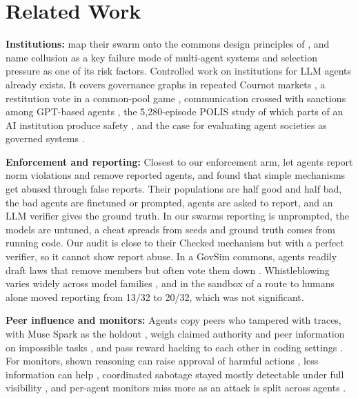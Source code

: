 \documentclass[11pt,letterpaper]{article}
\begin{document}
\section{Related Work}
\textbf{Institutions:} \citet{paglieri2026swarm} map their swarm onto the commons design principles of \citet{ostrom1990governing}, and \citet{hammond2025multiagent} name collusion as a key failure mode of multi-agent systems and selection pressure as one of its risk factors. Controlled work on institutions for LLM agents already exists. It covers governance graphs in repeated Cournot markets \citep{syrnikov2026institutional}, a restitution vote in a common-pool game \citep{bell2026restitution}, communication crossed with sanctions among GPT-based agents \citep{dante2025swords}, the 5,280-episode POLIS study of which parts of an AI institution produce safety \citep{x2026polis}, and the case for evaluating agent societies as governed systems \citep{truong2026institutional}.

\textbf{Enforcement and reporting:} Closest to our enforcement arm, \citet{ye2026norm} let agents report norm violations and remove reported agents, and found that simple mechanisms get abused through false reports. Their populations are half good and half bad, the bad agents are finetuned or prompted, agents are asked to report, and an LLM verifier gives the ground truth. In our swarms reporting is unprompted, the models are untuned, a cheat spreads from seeds and ground truth comes from running code. Our audit is close to their Checked mechanism but with a perfect verifier, so it cannot show report abuse. In a GovSim commons, agents readily draft laws that remove members but often vote them down \citep{rehm2026govsim}. Whistleblowing varies widely across model families \citep{agrawal2025whistleblow}, and in the sandbox of \citet{mikeda2026whistle} a route to humans alone moved reporting from 13/32 to 20/32, which was not significant.

\textbf{Peer influence and monitors:} Agents copy peers who tampered with traces, with Muse Spark as the holdout \citep{qin2026tamper}, weigh claimed authority and peer information on impossible tasks \citep{zhang2026troy}, and pass reward hacking to each other in coding settings \citep{hu2026transmissible,muralimohan2026verification}. For monitors, shown reasoning can raise approval of harmful actions \citep{za2026persuasion}, less information can help \citep{arike2026information}, coordinated sabotage stayed mostly detectable under full visibility \citep{radev2026scheme}, and per-agent monitors miss more as an attack is split across agents \citep{makins2026control}.
\end{document}
